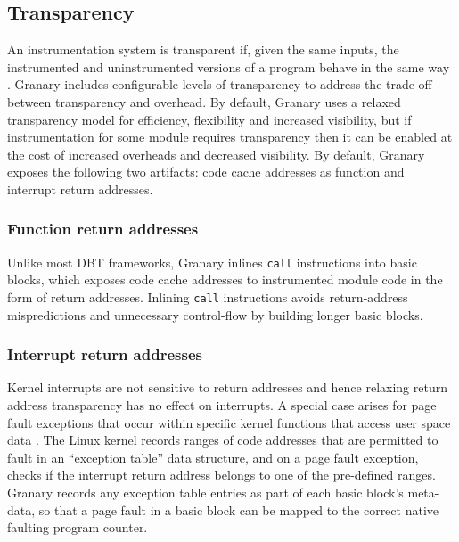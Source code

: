 \documentclass[preprint]{sigplanconf}
\begin{document}
\subsection{Transparency}\label{sec:transparency}

An instrumentation system is transparent if, given the same inputs, the instrumented and uninstrumented versions of a program behave in the same way \cite{Transparency}. Granary includes configurable levels of transparency to address the trade-off between transparency and overhead. By default, Granary uses a relaxed transparency model for efficiency, flexibility and increased visibility, but if instrumentation for some module requires transparency then it can be enabled at the cost of increased overheads and decreased visibility. By default, Granary exposes the following two artifacts: code cache addresses as function and interrupt return addresses.

\subsubsection{Function return addresses}\label{para:return_address_transparency} Unlike most DBT frameworks, Granary inlines \texttt{call} instructions into basic blocks, which exposes code cache addresses to instrumented module code in the form of return addresses. Inlining \texttt{call} instructions avoids return-address mispredictions and unnecessary control-flow by building longer basic blocks. 

\subsubsection{Interrupt return addresses} Kernel interrupts are not sensitive to return addresses and hence relaxing return address transparency has no effect on interrupts. A special case arises for page fault exceptions that occur within specific kernel functions that access user space data \cite{btkernel}. The Linux kernel records ranges of code addresses that are permitted to fault in an ``exception table'' data structure, and on a page fault exception, checks if the interrupt return address belongs to one of the pre-defined ranges. Granary records any exception table entries as part of each basic block's meta-data, so that a page fault in a basic block can be mapped to the correct native faulting program counter.
\end{document}
